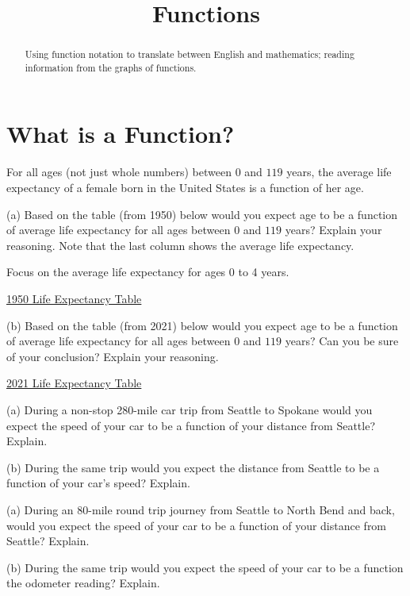 \documentclass{ximera}
\title{Functions}
\begin{document}
\begin{abstract}
Using function notation to translate between English and mathematics; reading information from the graphs of functions.
\end{abstract}
\maketitle

\section{What is a Function?}

\begin{question} \label{Qdfewrr5hgyh}
For all ages (not just whole numbers) between $0$ and $119$ years, the average life expectancy of a female born in the United States is a function of her age.

(a) Based on the table (from 1950) below would you expect age to be a function of average life expectancy for all ages between  $0$ and $119$ years? Explain your reasoning. Note that the last column shows the average life expectancy.

\begin{hint}
Focus on the average life expectancy for ages 0 to 4 years.
\end{hint}

\href{https://www.ssa.gov/oact/NOTES/as120/LifeTables_Tbl_7_1950.html}{1950 Life Expectancy Table}


(b)  Based on the table (from 2021) below would you expect age to be a function of average life expectancy for all ages between  $0$ and $119$ years? Can you be sure of your conclusion? Explain your reasoning. 

\href{https://www.ssa.gov/oact/STATS/table4c6.html}{2021 Life Expectancy Table}

\end{question}

\begin{question}  \label{Qdf4rr3gg}
(a) During a non-stop 280-mile car trip from Seattle to Spokane would you expect the speed of your car to be a function of your distance from Seattle? Explain.

(b) During the same trip would you expect the distance from Seattle to be a function of your car's speed? Explain.
\end{question}

\begin{question}  \label{Qer435r3434}
(a) During an 80-mile round trip journey from Seattle to North Bend and back, would you expect the speed of your car to be a function of your distance from Seattle? Explain.

(b) During the same trip would you expect the speed of your car to be a function the odometer reading? Explain.
\end{question}
\end{document}
